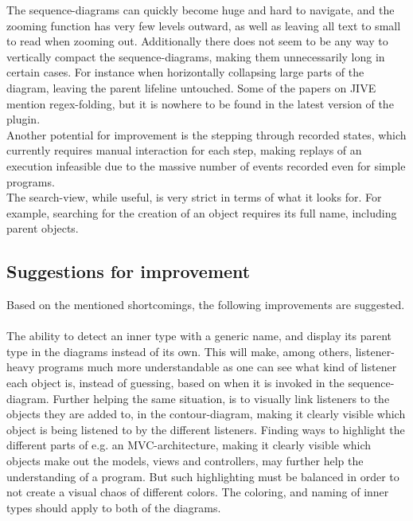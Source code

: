 The sequence-diagrams can quickly become huge and hard to navigate, and the zooming function has very few levels outward, as well as leaving all text to small to read when zooming out.
Additionally there does not seem to be any way to vertically compact the sequence-diagrams, making them unnecessarily long in certain cases.
For instance when horizontally collapsing large parts of the diagram, leaving the parent lifeline untouched.
Some of the papers on JIVE mention regex-folding, but it is nowhere to be found in the latest version of the plugin.
~\\

Another potential for improvement is the stepping through recorded states, which currently requires manual interaction for each step, making replays of an execution infeasible due to the massive number of events recorded even for simple programs.
~\\

The search-view, while useful, is very strict in terms of what it looks for.
For example, searching for the creation of an object requires its full name, including parent objects.
~\\

\subsection{Suggestions for improvement}\label{jiveSuggestions}

Based on the mentioned shortcomings, the following improvements are suggested.
~\\

The ability to detect an inner type with a generic name, and display its parent type in the diagrams instead of its own.
This will make, among others, listener-heavy programs much more understandable as one can see what kind of listener each object is, instead of guessing, based on when it is invoked in the sequence-diagram.%
Further helping the same situation, is to visually link listeners to the objects they are added to, in the contour-diagram, making it clearly visible which object is being listened to by the different listeners.%
Finding ways to highlight the different parts of e.g. an MVC-architecture, making it clearly visible which objects make out the models, views and controllers, may further help the understanding of a program.
But such highlighting must be balanced in order to not create a visual chaos of different colors.
The coloring, and naming of inner types should apply to both of the diagrams.
~\\

